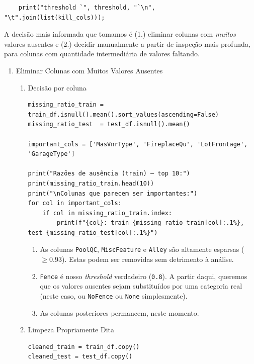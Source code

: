 \documentclass[11pt]{article}
\begin{document}
\begin{enumerate}
\begin{verbatim}
    print("threshold `", threshold, "`\n", "\t".join(list(kill_cols)));

\end{verbatim}

A decisão mais informada que tomamos é (1.) eliminar colunas com \emph{muitos} valores ausentes e (2.) decidir manualmente a partir de inspeção mais profunda, para colunas com quantidade intermediária de valores faltando.
\begin{enumerate}
\item Eliminar Colunas com Muitos Valores Ausentes
\label{sec:org1908837}
\begin{enumerate}
\item Decisão por coluna
\label{sec:orged8d3cf}
\begin{verbatim}
missing_ratio_train = train_df.isnull().mean().sort_values(ascending=False)
missing_ratio_test  = test_df.isnull().mean()

important_cols = ['MasVnrType', 'FireplaceQu', 'LotFrontage', 'GarageType']

print("Razões de ausência (train) — top 10:")
print(missing_ratio_train.head(10))
print("\nColunas que parecem ser importantes:")
for col in important_cols:
    if col in missing_ratio_train.index:
        print(f"{col}: train {missing_ratio_train[col]:.1%}, test {missing_ratio_test[col]:.1%}")
\end{verbatim}

\begin{enumerate}
\item As colunas \texttt{PoolQC}, \texttt{MiscFeature} e \texttt{Alley} são altamente esparsas (\(\geq 0.93\)). Estas podem ser removidas sem detrimento à análise.
\item \texttt{Fence} é nosso \emph{threshold} verdadeiro (\texttt{0.8}). A partir daqui, queremos que os valores ausentes sejam substituídos por uma categoria real (neste caso, ou \texttt{NoFence} ou \texttt{None} simplesmente).
\item As colunas posteriores permancem, neste momento.
\end{enumerate}
\item Limpeza Propriamente Dita
\label{sec:orga8aeac2}
\begin{verbatim}
cleaned_train = train_df.copy()
cleaned_test = test_df.copy()


\end{verbatim}
\end{enumerate}
\end{enumerate}
\end{enumerate}
\end{document}
